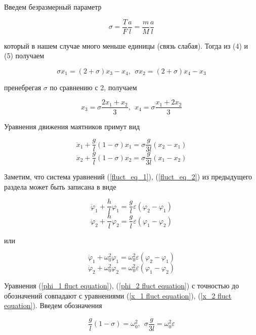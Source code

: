 \documentclass[14pt]{article}
\begin{document}
Введем безразмерный параметр

$$
\sigma = \frac{T}{F} \frac{a}{l} = \frac{m}{M}\frac{a}{l}
$$

\noindent который в нашем случае много меньше единицы (связь слабая). Тогда из (4) и (5) получаем

\begin{equation}
\sigma x_1 = (2 + \sigma)x_3 - x_4,~~\sigma x_2 = (2 + \sigma)x_4 - x_3
\end{equation}

\noindent пренебрегая $\sigma$ по сравнению с 2, получаем

\begin{equation}
x_3 = \sigma\frac{2x_1 + x_2}{3},~~ x_4 = \sigma\frac{x_1 + 2x_2}{3}
\end{equation}

Уравнения движения маятников примут вид

\begin{equation}\label{x_1 fluct equation}
\ddot x_1 + \frac{g}{l}(1 - \sigma)x_1 = \sigma\frac{g}{3l}(x_2 - x_1)
\end{equation}
\begin{equation}\label{x_2 fluct equation}
\ddot x_2 + \frac{g}{l}(1 - \sigma)x_2 = \sigma\frac{g}{3l}(x_1 - x_2)
\end{equation}

Заметим, что система уравнений (\ref{fluct_eq_1}), (\ref{fluct_eq_2}) из предыдущего раздела может быть записана в виде

$$
\ddot \varphi_1 + \frac{h}{l}\varphi_1 = \frac{g}{l}\varepsilon(\varphi_2 - \varphi_1)
$$
$$
\ddot \varphi_2 + \frac{h}{l}\varphi_2 = \frac{g}{l}\varepsilon(\varphi_1 - \varphi_2)
$$

\noindent или

\begin{equation}\label{phi_1 fluct equation}
\ddot \varphi_1 + \omega_0^2\varphi_1 = \omega_0^2\varepsilon(\varphi_2 - \varphi_1)
\end{equation}
\begin{equation}\label{phi_2 fluct equation}
\ddot \varphi_2 + \omega_0^2\varphi_2 = \omega_0^2\varepsilon(\varphi_1 - \varphi_2)
\end{equation}

\noindent Уравнения (\ref{phi_1 fluct equation}), (\ref{phi_2 fluct equation}) с точностью до обозначений совпадают с уравнениями 
(\ref{x_1 fluct equation}), (\ref{x_2 fluct equation}). Введем обозначения 

$$
\frac{g}{l}(1 - \sigma) = \omega_0^2, ~~\sigma\frac{g}{3l} = \omega_0^2\varepsilon
$$
\end{document}
